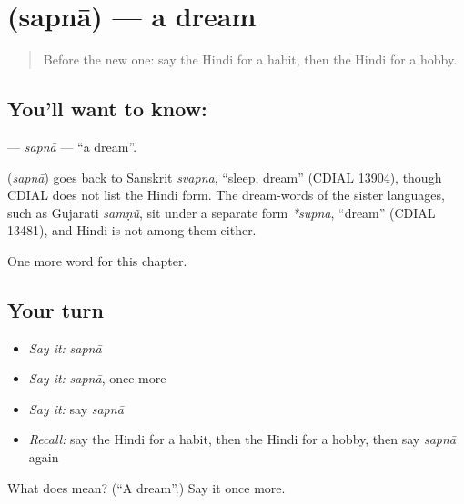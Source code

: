 \section[\texorpdfstring{\hi{सपना} (sapnā)}{सपना (sapnā)}]{ (sapnā) — a dream}

\label{lesson:HI-C223-sapna}



\begin{quote}
Before the new one: say the Hindi for a habit, then the Hindi for a hobby.
\end{quote}

\subsection*{You'll want to know: }
\textbf{} — \emph{sapnā} — \textquotedblleft{}a dream\textquotedblright{}.

\begin{cousinweb}
\textbf{} (\emph{sapnā}) goes back to Sanskrit \emph{svapna}, \textquotedblleft{}sleep, dream\textquotedblright{} (CDIAL 13904), though CDIAL does not list the Hindi form. The dream-words of the sister languages, such as Gujarati \emph{samṇũ}, sit under a separate form \emph{*supna}, \textquotedblleft{}dream\textquotedblright{} (CDIAL 13481), and Hindi is not among them either.
\end{cousinweb}

\begin{grammarlens}[title={What you've built}]
One more word for this chapter.
\end{grammarlens}

\subsection*{Your turn}
\begin{itemize}
\raggedright
  \item \emph{Say it:} \emph{sapnā}
  \item \emph{Say it:} \emph{sapnā}, once more
  \item \emph{Say it:} say \emph{sapnā}
  \item \emph{Recall:} say the Hindi for a habit, then the Hindi for a hobby, then say \emph{sapnā} again
\end{itemize}

\begin{tcolorbox}[breakable,colback=teal!4,colframe=teal!35!black,title={Before you move on}]
What does  mean? (\textquotedblleft{}A dream\textquotedblright{}.) Say it once more.
\end{tcolorbox}
